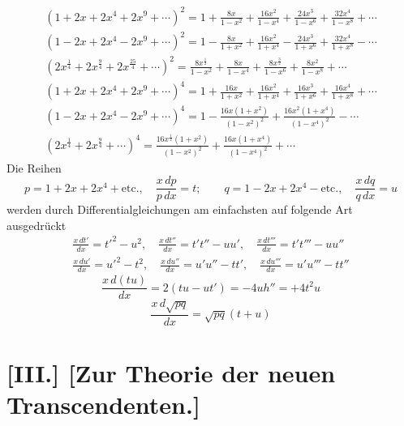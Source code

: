\documentclass[10pt,a4paper]{article}
\begin{document}
\begin{gather*}
(1 + 2x + 2x^4 + 2x^9 + \cdots)^2 = 1 + \frac{8x}{1 - x^2} + \frac{16x^2}{1 - x^4} + \frac{24x^3}{1 - x^6} + \frac{32x^4}{1 - x^8} + \cdots \\
(1 - 2x + 2x^4 - 2x^9 + \cdots)^2 = 1 - \frac{8x}{1 + x^2} + \frac{16x^2}{1 + x^4} - \frac{24x^3}{1 + x^6} + \frac{32x^4}{1 + x^8} - \cdots \\
(2x^{\frac{1}{4}} + 2x^{\frac{9}{4}} + 2x^{\frac{25}{4}} + \cdots)^2 = \frac{8x^{\frac{1}{2}}}{1 - x^2} + \frac{8x}{1 - x^4} + \frac{8x^{\frac{3}{2}}}{1 - x^6} + \frac{8x^2}{1 - x^8} + \cdots \\
(1 + 2x + 2x^4 + 2x^9 + \cdots)^4 = 1 + \frac{16x}{1 + x^2} + \frac{16x^2}{1 + x^4} + \frac{16x^3}{1 + x^6} + \frac{16x^4}{1 + x^8} + \cdots \\
(1 - 2x + 2x^4 - 2x^9 + \cdots)^4 = 1 - \frac{16x(1 + x^2)}{(1 - x^2)^2} + \frac{16x^2(1 + x^4)}{(1 - x^4)^2} - \cdots \\
(2x^{\frac{1}{4}} + 2x^{\frac{9}{4}} + \cdots)^4 = \frac{16x^{\frac{1}{2}}(1 + x^2)}{(1 - x^2)^2} + \frac{16x(1 + x^4)}{(1 - x^4)^2} + \cdots
\end{gather*}
%
Die Reihen
%
\begin{equation*}
p = 1 + 2x + 2x^4 + \text{etc.}, \quad \frac{x\, dp}{p\, dx} = t; \qquad
q = 1 - 2x + 2x^4 - \text{etc.}, \quad \frac{x\, dq}{q\, dx} = u
\end{equation*}
%
werden durch Differentialgleichungen am einfachsten auf folgende Art ausgedrückt
%
\begin{gather*}
\frac{x\, dt'}{dx} = t'^2 - u^2, \quad
\frac{x\, dt''}{dx} = t't'' - uu', \quad
\frac{x\, dt'''}{dx} = t't''' - uu'' \\
\frac{x\, du'}{dx} = u'^2 - t^2, \quad
\frac{x\, du''}{dx} = u'u'' - tt', \quad
\frac{x\, du'''}{dx} = u'u''' - tt''
\end{gather*}
%
\begin{equation*}
\frac{x\, d(tu)}{dx} = 2(tu - ut') = -4uh'' = +4t^2u
\end{equation*}
%
\begin{equation*}
\frac{x\, d\sqrt{pq}}{dx} = \sqrt{pq}(t + u)
\end{equation*}

\section*{[III.] [Zur Theorie der neuen Transcendenten.]}
\end{document}
